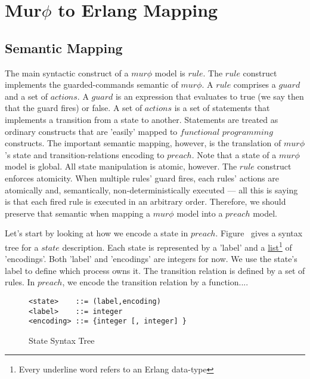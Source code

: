 \chapter{Mur$\phi$ to Erlang Mapping}

\section{Semantic Mapping}

The main syntactic construct of a $mur\phi$ model is $rule$. The $rule$ 
construct implements
the guarded-commands semantic of $mur\phi$. A $rule$ comprises a $guard$ and a set
of $actions$. A $guard$ is an expression that evaluates to true (we say then that the 
guard fires) or false. A set of $actions$ is a set of statements that implements
a transition from a state to another. Statements are treated as ordinary constructs
that are 'easily' mapped to $functional$ $programming$ constructs. The important
semantic mapping, however, is the translation of $mur\phi$'s state and 
transition-relations encoding to $preach$.
Note that a state of a $mur\phi$ model is global. All state manipulation is atomic, 
however.
The $rule$ construct enforces atomicity. When multiple rules' guard fires, each
rules' actions are atomically and, semantically, non-deterministically executed --- 
all this is saying is that each fired rule is executed in an arbitrary order.
Therefore, we should preserve that semantic when mapping a $mur\phi$ model into
a $preach$ model.

Let's start by looking at how we encode a state in $preach$. Figure~\label{Sst} gives
a syntax tree for a $state$ description. Each state is represented by a 'label'
and a \underline{list}\footnote{Every underline word refers to an Erlang data-type} 
 of 'encodings'. Both 'label' and 'encodings' are integers for now. We use the 
state's label to define which process owns it. 
The transition relation is defined by a set of rules. In $preach$, we encode the
transition relation by a function.... 

\begin{figure}
\begin{verbatim} 
<state>    ::= (label,encoding)
<label>    ::= integer
<encoding> ::= {integer [, integer] }
\end{verbatim}
\caption{State Syntax Tree}
\label{Sst}
\end{figure}


